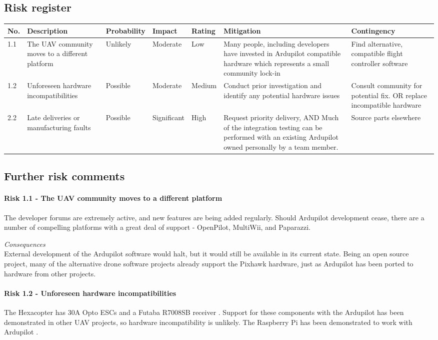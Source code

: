\documentclass[a4paper, 11pt, titlepage]{article}
\begin{document}
\subsection{Risk register}
\begin{tabularx}{\textwidth}{lXlllXX}
\hline
    No.   & Description & Probability & Impact & Rating & Mitigation & Contingency \\
    \hline
    1.1   & The UAV community moves to a different platform & Unlikely & Moderate & Low   & Many people, including developers have invested in Ardupilot compatible hardware which represents a small community lock-in & Find alternative, compatible flight controller software \\ \hline
    1.2   & Unforeseen hardware incompatibilities & Possible & Moderate & Medium & Conduct prior investigation and identify any potential hardware issues & Consult community for potential fix. OR replace incompatible hardware \\ \hline
    2.2   & Late deliveries or manufacturing faults & Possible & Significant & High  & Request priority delivery, AND Much of the integration testing can be performed with an existing Ardupilot owned personally by a team member. & Source parts elsewhere \\
    \hline
\end{tabularx}

\subsection{Further risk comments}
\paragraph{Risk 1.1 - The UAV community moves to a different platform}
The developer forums are extremely active, and new features are being added regularly.  Should Ardupilot development cease, there are a number of compelling platforms with a great deal of support - OpenPilot, MultiWii,  and Paparazzi. 

\textit{Consequences} \\
External development of the Ardupilot software would halt, but it would still be available in its current state.  Being an open source project, many of the alternative drone software projects already support the Pixhawk hardware, just as Ardupilot has been ported to hardware from other projects.

\paragraph{Risk 1.2 - Unforeseen hardware incompatibilities}
The Hexacopter has 30A Opto ESCs and a Futaba R7008SB receiver \cite{futaba-pixhawk}. Support for these components with the Ardupilot has been demonstrated in other UAV projects, so hardware incompatibility is unlikely. The Raspberry Pi has been demonstrated to work with Ardupilot \cite{ardu-rpi-mavlink}. 
\end{document}

